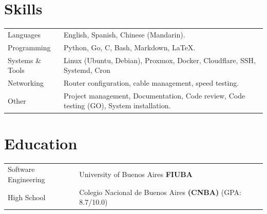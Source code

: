 \documentclass[a4paper,12pt]{article}
\begin{document}
\section{Skills}
\begin{tabularx}{\linewidth}{@{}l X@{}}
Languages &  \normalsize{English, Spanish, Chinese (Mandarin).}\\
Programming  &  \normalsize{Python, Go, C, Bash, Markdown, LaTeX.}\\ 
Systems \& Tools &  \normalsize{Linux (Ubuntu, Debian), Proxmox, Docker, Cloudflare, SSH, Systemd, Cron}\\ 
Networking  &  \normalsize{Router configuration, cable management, speed testing.}\\ 
Other  &  \normalsize{Project management, Documentation, Code review, Code testing (GO),  System installation.}\\ 
\end{tabularx}



\section{Education}
\begin{tabularx}{\linewidth}{@{}l X@{}}	
Software Engineering & University of Buenos Aires \textbf{FIUBA} \hfill \normalsize  \\

High School & Colegio Nacional de Buenos Aires \textbf{(CNBA)} \hfill (GPA: 8.7/10.0) \\ 

\end{tabularx}



\end{document}
